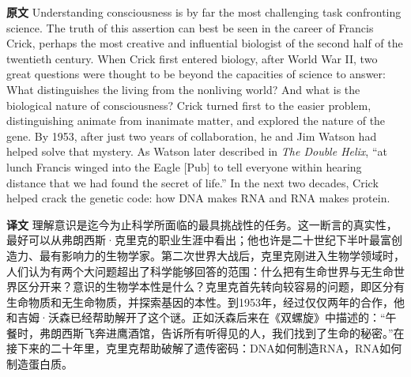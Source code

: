 \documentclass[UTF8]{ctexart}
\newenvironment{english}{\par\small\noindent\textbf{原文}\quad\ignorespaces}{\par}
\newenvironment{zhtranslation}{\par\noindent\textbf{译文}\quad\ignorespaces}{\par\vspace{0.35em}}
\begin{document}
\begin{english}
Understanding consciousness is by far the most challenging task confronting science. The truth of this assertion can best be seen in the career of Francis Crick, perhaps the most creative and influential biologist of the second half of the twentieth century. When Crick first entered biology, after World War II, two great questions were thought to be beyond the capacities of science to answer: What distinguishes the living from the nonliving world? And what is the biological nature of consciousness? Crick turned first to the easier problem, distinguishing animate from inanimate matter, and explored the nature of the gene. By 1953, after just two years of collaboration, he and Jim Watson had helped solve that mystery. As Watson later described in \emph{The Double Helix}, “at lunch Francis winged into the Eagle [Pub] to tell everyone within hearing distance that we had found the secret of life.” In the next two decades, Crick helped crack the genetic code: how DNA makes RNA and RNA makes protein.
\end{english}
\begin{zhtranslation}
理解意识是迄今为止科学所面临的最具挑战性的任务。这一断言的真实性，最好可以从弗朗西斯·克里克的职业生涯中看出；他也许是二十世纪下半叶最富创造力、最有影响力的生物学家。第二次世界大战后，克里克刚进入生物学领域时，人们认为有两个大问题超出了科学能够回答的范围：什么把有生命世界与无生命世界区分开来？意识的生物学本性是什么？克里克首先转向较容易的问题，即区分有生命物质和无生命物质，并探索基因的本性。到1953年，经过仅仅两年的合作，他和吉姆·沃森已经帮助解开了这个谜。正如沃森后来在《双螺旋》中描述的：“午餐时，弗朗西斯飞奔进鹰酒馆，告诉所有听得见的人，我们找到了生命的秘密。”在接下来的二十年里，克里克帮助破解了遗传密码：DNA如何制造RNA，RNA如何制造蛋白质。\end{zhtranslation}
\end{document}
